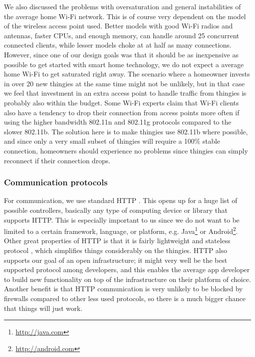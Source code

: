 \documentclass{ubicomp2012}
\begin{document}
We also discussed the problems with oversaturation and general instabilities of the average home Wi-Fi network. This is of course very dependent on the model of the wireless access point used. Better models with good Wi-Fi radios and antennas, faster CPUs, and enough memory, can handle around 25 concurrent connected clients, while lesser models choke at at half as many connections. However, since one of our design goals was that it should be as inexpensive as possible to get started with smart home technology, we do not expect a average home Wi-Fi to get saturated right away. The scenario where a homeowner invests in over 20 new thingies at the same time might not be unlikely, but in that case we feel that investment in an extra access point to handle traffic from thingies is probably also within the budget. Some Wi-Fi experts claim that Wi-Fi clients also have a tendency to drop their connection from access points more often if using the higher bandwidth 802.11n and 802.11g protocols compared to the slower 802.11b. The solution here is to make thingies use 802.11b where possible, and since only a very small subset of thingies will require a 100\% stable connection, homeowners should experience no problems since thingies can simply reconnect if their connection drops.
\subsubsection{Communication protocols}

For communication, we use standard HTTP \cite{Fielding:1999:HTP:RFC2616}. This opens up for a huge list of possible controllers, basically any type of computing device or library that supports HTTP. This is especially important to us since we do not want to be limited to a certain framework, language, or platform, e.g. Java\footnote{\url{http://java.com}} or Android\footnote{\url{http://android.com}}. Other great properties of HTTP is that it is fairly lightweight and stateless protocol \cite{Fielding:1999:HTP:RFC2616}, which simplifies things considerably on the thingies. HTTP also supports our goal of an open infrastructure; it might very well be the best supported protocol among developers, and this enables the average app developer to build new functionality on top of the infrastructure on their platform of choice. Another benefit is that HTTP communication is very unlikely to be blocked by firewalls compared to other less used protocols, so there is a much bigger chance that things will just work.
\end{document}
